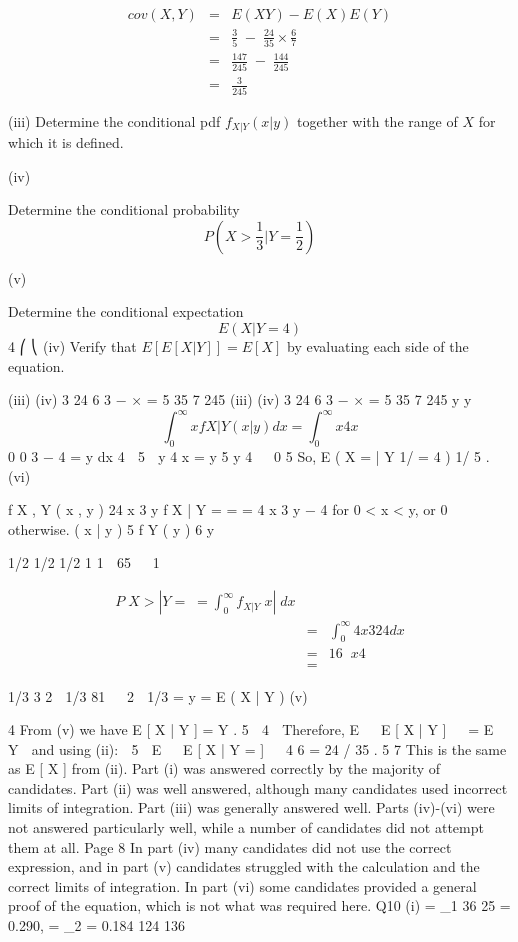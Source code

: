 \documentclass[a4paper,12pt]{article}
\begin{document}
\begin{eqnarray*}
cov ( X , Y ) &=& E ( XY ) − E ( X ) E ( Y ) \\
&=& \frac{3}{5} \;-\; \frac{24}{35} \times \frac{6}{7} \\
&=& \frac{147}{245} \;-\; \frac{144}{245} \\
&=& \frac{3}{245}  
\end{eqnarray*}


(iii) Determine the conditional pdf $f_{X |Y}(x| y)$ together with the range of $X$ for which
it is defined. 


(iv)

Determine the conditional probability \[P\left( X > \frac{1}{3} | Y = \frac{1}{2} \right)\]

(v)


Determine the conditional expectation \[E\left( X | Y=4 \right)\]
4   
⎛
⎝
(iv)
Verify that $E[E[X |Y ]] = E[X]$ by evaluating each side of the equation.





(iii)
(iv)
3 24 6
3
− × =
5 35 7 245
(iii)
(iv)
3 24 6
3
− × =
5 35 7 245
y
y
\[\int^{\infty}_{0} xf X | Y ( x | y ) dx = \int^{\infty}_{0} x 4 x\]
0
0
3 − 4
=
y dx
4  5  y 4
x =
y
5 y 4   0 5
So, E ( X
=
| Y 1/ =
4 ) 1/ 5 .
(vi)

f X , Y ( x , y ) 24 x 3 y
f X | Y =
= =
4 x 3 y − 4 for 0 < x < y, or 0 otherwise.
( x | y )   
5
f Y ( y )
6 y

1/2
1/2
1/2
1
1 
65

 1 

\begin{eqnarray*}
P  X > | Y =  = \int^{\infty}_{0} f_{X | Y}  x |  dx \\
&=& \int^{\infty}_{0} 4 x 3 2 4 dx \\
&=&  16   x 4   \\ 
&=&
\end{eqnarray*}

1/3
3
2  1/3
81

 2 
1/3
= y =
E ( X | Y
)
(v)



4
From (v) we have E [ X | Y ] =    Y .
5
 4 
Therefore, E   E [ X | Y ]   = E  Y  and using (ii):
 5 
E   E [ X | Y =
]  
4 6
= 24 / 35 .
5 7
This is the same as E [ X ] from (ii).
Part (i) was answered correctly by the majority of candidates. Part (ii)
was well answered, although many candidates used incorrect limits of
integration. Part (iii) was generally answered well. Parts (iv)-(vi) were
not answered particularly well, while a number of candidates did not
attempt them at all.
Page 8
In part (iv) many candidates did not use the correct expression, and in
part (v) candidates struggled with the calculation and the correct limits
of integration. In part (vi) some candidates provided a general proof of
the equation, which is not what was required here.
Q10
(i)
=
_1
36
25
= 0.290, =
_2 = 0.184
124
136
\end{document}
